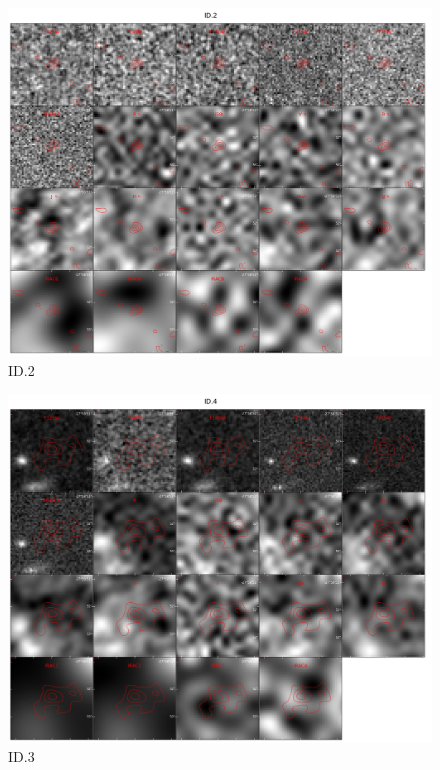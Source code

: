 \begin{figure}[tbp]
\centering \includegraphics[width=120mm]{Matched/ASPECS_Cutout_1.jpg}
\caption{ID.2}
\label{fig:Match_Two}
\end{figure}

\begin{figure}[tbp]
\centering \includegraphics[width=120mm]{Matched/ASPECS_Cutout_3.jpg}
\caption{ID.3}
\label{fig:Match_Three}
\end{figure}

